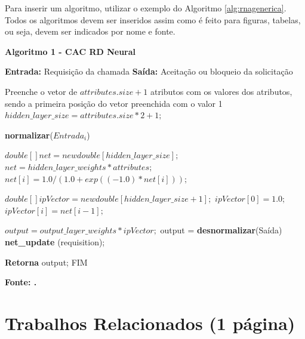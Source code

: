 Para inserir um algoritmo, utilizar o exemplo do Algoritmo  \ref{alg:rnagenerica}.
Todos os algoritmos devem ser inseridos assim como é feito para figuras, tabelas, ou seja, devem ser indicados por nome e fonte.


\begin{center}	
    \textbf{Algoritmo 1 -  CAC RD Neural}
	\vspace{-0.3cm}
\begin{minipage}[ht]{13cm}
\begin{algorithm}[H]
  \footnotesize
  \caption{CAC-RD Neural}
  \label{alg:rnagenerica}
  \begin{algorithmic}[1]
      \STATE \textbf{Entrada:} Requisição da chamada
    \STATE \textbf{Saída:} Aceitação ou bloqueio da solicitação
    
    \STATE Preenche o vetor de $attributes.size+1$ atributos com os valores dos atributos, sendo a primeira posição do vetor preenchida com o valor 1
		\STATE $hidden\_layer\_size =  attributes.size*2+1;$

    	\STATE \textbf{normalizar}($Entrada_i$)
    \ENDFOR

		\STATE $double [] net = new double [hidden\_layer\_size];$
    \STATE $net = hidden\_layer\_weights * attributes;$
			\STATE $net [i] = 1.0 / (1.0 + exp((-1.0)*net[i]));$
		\ENDFOR

		\STATE $double [] ipVector = new double [hidden\_layer\_size+1];$
    \STATE $ipVector [0] = 1.0;$
			\STATE $ipVector [i] = net [i-1];$
		\ENDFOR
		
		\STATE $output = output\_layer\_weights *  ipVector;$
    \STATE output = \textbf{desnormalizar}(Saída)
    \STATE \textbf{net\_update} (requisition);
    
    \STATE \textbf{Retorna} output; FIM
  \end{algorithmic}
\end{algorithm}

\small \centering \textbf{\footnotesize Fonte: .}
\end{minipage}
\end{center}
   
\estrutura\section{\esp Trabalhos Relacionados (1 página)}\instrucao

